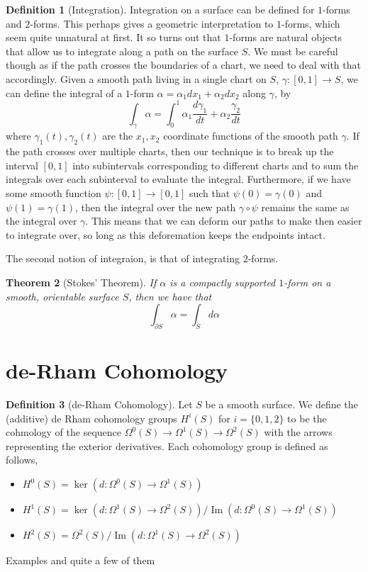 \documentclass[11pt]{report}
\newtheorem{thm}{Theorem}[section]
\theoremstyle{definition}
\newtheorem{defn}[thm]{Definition}
\DeclareMathOperator{\im}{Im}
\begin{document}
\begin{defn}[Integration]\label{Integration}
  Integration on a surface can be defined for $1$-forms and $2$-forms. This perhaps gives a geometric interpretation to $1$-forms, which seem quite unnatural at first. It so turns out that $1$-forms are natural objects that allow us to integrate along a path on the surface $S$. We must be careful though as if the path crosses the boundaries of a chart, we need to deal with that accordingly. Given a smooth path living in a single chart on $S$, $\gamma \colon [0,1] \rightarrow S$, we can define the integral of a $1$-form $\alpha = \alpha_1 dx_1 + \alpha_2 dx_2$ along $\gamma$, by 
  \[\int_{\gamma}\alpha = \int_0^1\alpha_1\frac{d\gamma_1}{dt}+\alpha_2\frac{\gamma_2}{dt}\] where $\gamma_1(t),\gamma_2(t)$ are the $x_1, x_2$ coordinate functions of the smooth path $\gamma$. If the path crosses over multiple charts, then our technique is to break up the interval $[0,1]$ into subintervals corresponding to different charts and to sum the integrals over each subinterval to evaluate the integral. Furthermore, if we have some smooth function $\psi \colon [0,1] \rightarrow [0,1]$ such that $\psi(0)=\gamma(0)$ and $\psi(1)=\gamma(1)$, then the integral over the new path $\gamma \circ \psi$ remains the same as the integral over $\gamma$. This means that we can deform our paths to make then easier to integrate over, so long as this deforemation keeps the endpoints intact.

  The second notion of integraion, is that of integrating $2$-forms.
\end{defn}

\begin{thm}[Stokes' Theorem]
  If $\alpha$ is a compactly supported $1$-form on a smooth, orientable surface $S$, then we have that
  \[\int_{\partial S} \alpha = \int_S d\alpha \]
\end{thm} 

\section{de-Rham Cohomology}

\begin{defn}[de-Rham Cohomology]\label{deRham}
  Let $S$ be a smooth surface. We define the (additive) de Rham cohomology groups $H^i(S)$ for $i=\{0,1,2\}$ to be the cohmology of the sequence $\Omega^0(S)\rightarrow \Omega^1(S)\rightarrow \Omega^2(S)$ with the arrows representing the exterior derivatives. Each cohomology group is defined as follows,
  \begin{itemize}
    \item $H^0(S)=\ker(d:\Omega^0(S)\rightarrow\Omega^1(S))$
    \item $H^1(S)=\ker(d:\Omega^1(S)\rightarrow\Omega^2(S))/\im(d:\Omega^0(S)\rightarrow \Omega^1(S))$
    \item $H^2(S)=\Omega^2(S)/\im(d:\Omega^1(S)\rightarrow \Omega^2(S))$
  \end{itemize}
\end{defn}
Examples and quite a few of them
\end{document}
